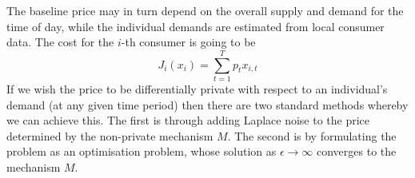 \documentclass[a4paper,onecolumn]{article}
\numberwithin{algorithm}{section}
\theoremstyle{plain}
\theoremstyle{definition}
\theoremstyle{example}
\newcommand{\eps}{\epsilon}
\newcommand{\demand}{x}
\newcommand{\price}{p}
\newcommand{\cost}{J}
\newcommand{\nmech}{M}
\begin{document}
The baseline price may in turn depend on the overall supply and demand
for the time of day, while the individual demands are estimated from
local consumer data.  The cost for the $i$-th consumer is going to be
\[
\cost_i(\demand_i) = \sum_{t=1}^T \price_t \demand_{i,t}
\]
If we wish the price to be differentially private with respect to an individual's demand (at any given time period) then there are two standard methods whereby we can achieve this. The first is through adding Laplace noise to the price determined by the non-private mechanism $\nmech$. The second is by formulating the problem as an optimisation problem, whose solution as $\eps \to \infty$ converges to the mechanism $\nmech$.




\end{document}
